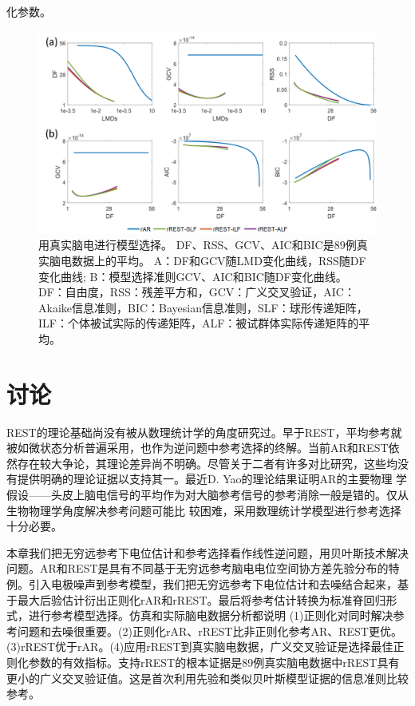 化参数。
\begin{figure}[!h]
	\centering
	\includegraphics[width=15cm]{pic/Frontier/figure8.png}
	\caption{用真实脑电进行模型选择。 DF、RSS、GCV、AIC和BIC是89例真实脑电数据上的平均。 A：DF和GCV随LMD变化曲线，RSS随DF变化曲线; B：模型选择准则GCV、AIC和BIC随DF变化曲线。 DF：自由度，RSS：残差平方和，GCV：广义交叉验证，AIC：Akaike信息准则，BIC：Bayesian信息准则，SLF：球形传递矩阵，ILF：个体被试实际的传递矩阵，ALF：被试群体实际传递矩阵的平均。}
	\label{3:8}
\end{figure}

\section{讨论}
REST的理论基础尚没有被从数理统计学的角度研究过。早于REST，平均参考就被如微状态分析普遍采用，也作为逆问题中参考选择的终解。当前AR和REST依然存在较大争论，其理论差异尚不明确。尽管关于二者有许多对比研究，这些均没有提供明确的理论证据以支持其一。最近D. Yao的理论结果证明AR的主要物理
学假设——头皮上脑电信号的平均作为对大脑参考信号的参考消除一般是错的。仅从生物物理学角度解决参考问题可能比
较困难，采用数理统计学模型进行参考选择十分必要。

本章我们把无穷远参考下电位估计和参考选择看作线性逆问题，用贝叶斯技术解决问题。AR和REST是具有不同基于无穷远参考脑电电位空间协方差先验分布的特例。引入电极噪声到参考模型，我们把无穷远参考下电位估计和去噪结合起来，基于最大后验估计衍出正则化rAR和rREST。最后将参考估计转换为标准脊回归形式，进行参考模型选择。仿真和实际脑电数据分析都说明 (1)正则化对同时解决参考问题和去噪很重要。(2)正则化rAR、rREST比非正则化参考AR、REST更优。(3)rREST优于rAR。(4)应用rREST到真实脑电数据，广义交叉验证是选择最佳正则化参数的有效指标。支持rREST的根本证据是89例真实脑电数据中rREST具有更小的广义交叉验证值。这是首次利用先验和类似贝叶斯模型证据的信息准则比较参考。

